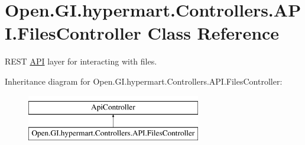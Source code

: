 \hypertarget{class_open_1_1_g_i_1_1hypermart_1_1_controllers_1_1_a_p_i_1_1_files_controller}{}\section{Open.\+G\+I.\+hypermart.\+Controllers.\+A\+P\+I.\+Files\+Controller Class Reference}
\label{class_open_1_1_g_i_1_1hypermart_1_1_controllers_1_1_a_p_i_1_1_files_controller}


R\+E\+ST \hyperlink{namespace_open_1_1_g_i_1_1hypermart_1_1_controllers_1_1_a_p_i}{A\+PI} layer for interacting with files.  


Inheritance diagram for Open.\+G\+I.\+hypermart.\+Controllers.\+A\+P\+I.\+Files\+Controller\+:\begin{figure}[H]
\begin{center}
\leavevmode
\includegraphics[height=2.000000cm]{class_open_1_1_g_i_1_1hypermart_1_1_controllers_1_1_a_p_i_1_1_files_controller}
\end{center}
\end{figure}
